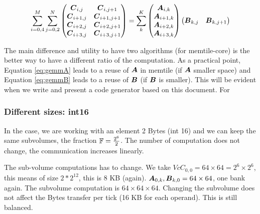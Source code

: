 \documentclass[journal]{IEEEtran}
\begin{document}
{\small \begin{equation*}
    \sum_{i=0,4}^M
    \sum_{j=0,2}^N
  \begin{pmatrix}
    {\boldsymbol C}_{i,j}  & {\boldsymbol C}_{i,  j+1}  \\
    {\boldsymbol C}_{i+1,j} & {\boldsymbol C}_{i+1,j+1} \\
    {\boldsymbol C}_{i+2,j} & {\boldsymbol C}_{i+2,j+1} \\
    {\boldsymbol C}_{i+3,j} & {\boldsymbol C}_{i+3,j+1} \\ 
  \end{pmatrix}    = \sum_k^K
  \begin{pmatrix}
    {\boldsymbol A}_{i,  k}  \\
    {\boldsymbol A}_{i+1,k}   \\
    {\boldsymbol A}_{i+2,k}  \\
    {\boldsymbol A}_{i+3,k}   \\
  \end{pmatrix}  
  \begin{pmatrix}
    {\boldsymbol B}_{k,j}  &  {\boldsymbol B}_{k,j+1} \\
  \end{pmatrix}    
\end{equation*}
}

The main difference and utility to have two algorithms (for
memtile-core) is the better way to have a different ratio of the
computation. As a practical point, Equation \ref{eq:gemmA} leads to a
reuse of ${\boldsymbol A}$ in memtile (if ${\boldsymbol A}$ smaller space) and Equation
\ref{eq:gemmB} leads to a reuse of ${\boldsymbol B}$ (if ${\boldsymbol B}$ is smaller).
This will be evident when we write and present a code generator based
on this document. For


\subsubsection{Different sizes: int16}
In the case, we are working with an element 2 Bytes (int 16) and we
can keep the same subvolumes, the fraction $\mathbb{F} = \frac{2^6}{2}$. The
number of computation does not change, the communication increases
linearly.

The sub-volume computations has to change. We take $Vc{C}_{0,0} =
64\times 64 = 2^6 \times 2^6$, this means of size $2*2^12$, this is 8
KB (again). ${\boldsymbol A}_{0,k}, {\boldsymbol B}_{k,0} = 64 \times 64$, one bank
again. The subvolume computation is $64\times 64 \times 64$. Changing
the subvolume does not affect the Bytes transfer per tick (16 KB for
each operand). This is still balanced.
\end{document}
